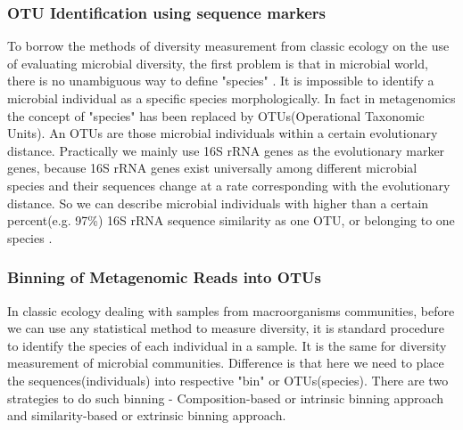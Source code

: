 \subsubsection{OTU Identification using sequence markers} To borrow the methods
of diversity measurement from classic ecology on the use of evaluating
microbial diversity, the first problem is that in microbial world, there is no
unambiguous way to define "species" \cite{Stackebrandt:2002aa}. It is
impossible to identify a microbial individual as a specific species
morphologically. In fact in metagenomics the concept of "species" has been
replaced by OTUs(Operational Taxonomic Units). An OTUs are those microbial
individuals within a certain evolutionary distance. Practically we mainly use
16S rRNA genes as the evolutionary marker genes, because 16S rRNA genes exist
universally among different microbial species and their sequences change at a
rate corresponding with the evolutionary distance. So we can describe microbial
individuals with higher than a certain percent(e.g. 97\%) 16S rRNA sequence
similarity as one OTU, or belonging to one species \cite{Schloss:2005aa}.

\subsubsection{Binning of Metagenomic Reads into OTUs}

In classic ecology dealing with samples from macroorganisms communities, before
we can use any statistical method to measure diversity, it is standard
procedure to identify the species of each individual in a sample. It is the
same for diversity measurement of microbial communities. Difference is that
here we need to place the sequences(individuals) into respective "bin" or
OTUs(species). There are two strategies to do such binning - Composition-based
or intrinsic binning approach and similarity-based or extrinsic binning
approach.

